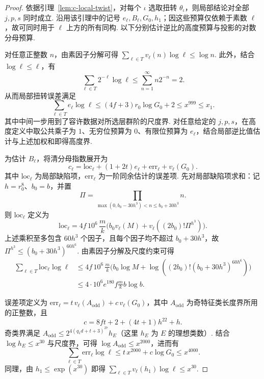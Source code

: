 \begin{proof}
依据引理~\ref{lem:c-local-twist}，对每个 $\iota$ 选取扭转 $\theta_\iota$，则局部结论对全部 $j,p,s$ 同时成立.
沿用该引理中的记号 $e_\ell,B_\ell,G_0,h_1$；因这些预算仅依赖于素数 $\ell$，故可同时用于 $\ell$ 上方的所有同构.
以下分别估计逆比的高度预算与投影的对数分母预算.

对任意正整数 $n$，由素因子分解可得 $\sum_{\ell\in T}v_\ell(n)\log\ell\le\log n$.
此外，结合 $\log\ell\le\ell$，有
\[
 \sum_{\ell\in T}2^{-\ell}\log\ell
 \le \sum_{n=1}^{\infty} n 2^{-n}=2.
\]
从而局部扭转误差满足
\[
 \sum_{\ell\in T}e_\ell\log\ell
 \le (4f+3)r_0\log G_0+2\le x^{999}\le x_1 .
\]
其中中间一步用到了容许数据对所选层群阶的尺度界.
对任意给定的 $j,p,s$，在高度定义中取公共乘子为 $1$、无穷位预算为 $0$、有限位预算为 $e_\ell$，结合局部逆比值估计与上述加权和即得高度界.

为估计 $B_\ell$，将清分母指数展开为
\[
 c_\ell
 =\mathrm{loc}_\ell+(1+2t)e_\ell+\mathrm{err}_\ell+v_\ell(G_0).
\]
其中 $\mathrm{loc}_\ell$ 为局部缺陷项，$\mathrm{err}_\ell$ 为一阶同余估计的误差项.
先对局部缺陷项求和：记 $h=r_0^8$、$b_0=b$，并置
\[
 \Pi=\prod_{\max(0,b_0-30h^3)<n\le b_0+30h^3}n .
\]
则 $\mathrm{loc}_\ell$ 定义为
\[
 \mathrm{loc}_\ell
 =4f\,10^6\,\frac{m}{k}
  \bigl(b_0v_\ell(M)+v_\ell((2b_0)!\Pi^{h^3})\bigr).
\]
上述乘积至多包含 $60h^3$ 个因子，且每个因子均不超过 $b_0+30h^3$，故 $\Pi^{h^3}\le(b_0+30h^3)^{60h^6}$.
由素因子分解及尺度约束可得
\begin{align*}
 \sum_{\ell\in T}\mathrm{loc}_\ell\log\ell
 &\le 4f\,10^6\,\frac{m}{k}
    \bigl(b_0\log M+\log((2b_0)!(b_0+30h^3)^{60h^6})\bigr)\\
 &\le 4\cdot10^6 e^{180} f\frac{m}{k}b\log b .
\end{align*}

误差项定义为 $\mathrm{err}_\ell=t\,v_\ell(A_{\mathrm{odd}})+c\,v_\ell(G_0)$，其中 $A_{\mathrm{odd}}$ 为奇特征类长度界所用的正整数，且
\[
 c=8ft+2+(4t+1)h^{22}+h.
\]
奇类界满足 $A_{\mathrm{odd}}\le 2^{4(q_1d+t+3)^{27}}h_E$（这里 $h_E$ 为 $E$ 的理想类数）.
结合 $\log h_E\le x^{30}$ 与尺度界，可得 $\log A_{\mathrm{odd}}\le x^{2000}$，进而有
\[
 \sum_{\ell\in T}\mathrm{err}_\ell\log\ell
 \le t\,x^{2000}+c\log G_0\le x^{4000}.
\]
同理，由 $h_1\le\exp(x^{30})$ 即得 $\sum_{\ell\in T}v_\ell(h_1)\log\ell\le x^{30}$.


\end{proof}
